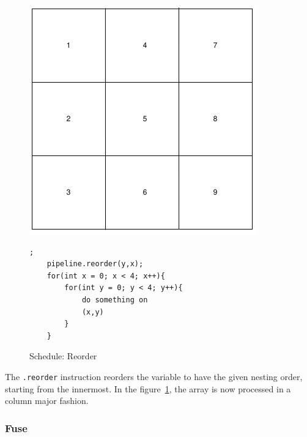 \begin{figure}[H]

		\begin{minipage}[c]{\EIW}
			\centering
		\includegraphics[width=\textwidth]{Images/Reorder.png}
		\end{minipage}
		\begin{minipage}[c]{\ECW}
			\centering
\begin{lstlisting}[label={code:reorder}];
    pipeline.reorder(y,x);
	for(int x = 0; x < 4; x++){
		for(int y = 0; y < 4; y++){
			do something on
			(x,y)
		}
	}
\end{lstlisting}
		\end{minipage}
		\caption{Schedule: Reorder}
		\label{schedule:reorder}
\end{figure}
	
	The \texttt{.reorder} instruction reorders the variable to have the given nesting order, starting from the innermost. In the figure~\ref{schedule:reorder}, the  array is now processed in a column major fashion.

	\subsubsection{Fuse}


